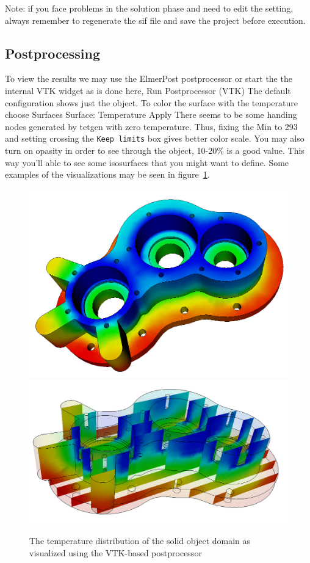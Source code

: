 Note: if you face problems in the solution phase and need to edit the setting, always remember to regenerate the
sif file and save the project before execution.


\subsection*{Postprocessing}

To view the results we may use the ElmerPost postprocessor or start the the internal VTK widget as is done 
here, 
\ttbegin
Run
  Postprocessor (VTK)
\ttend
The default configuration shows just the object. To color the surface with the temperature choose
\ttbegin
Surfaces 
  Surface: Temperature
  Apply
\ttend
There seems to be some handing nodes generated by tetgen with zero temperature. Thus, fixing the Min to 
293 and setting crossing the \texttt{Keep limits} box gives better color scale. 
You may also turn on opasity in order to see through the object, 10-20\% is a good value.
This way you'll able to see some isosurfaces that you might want to define.
Some examples of the visualizations may be seen in figure~\ref{fg:vtkpost1}.

\begin{figure}
\begin{center}
\includegraphics[width=120mm]{tempdist} \\
\includegraphics[width=120mm]{tempdist2}
\caption{The temperature distribution of the solid object domain as visualized using the VTK-based postprocessor}\label{fg:vtkpost1}
\end{center}
\end{figure}

\hfill
\mbox{}






